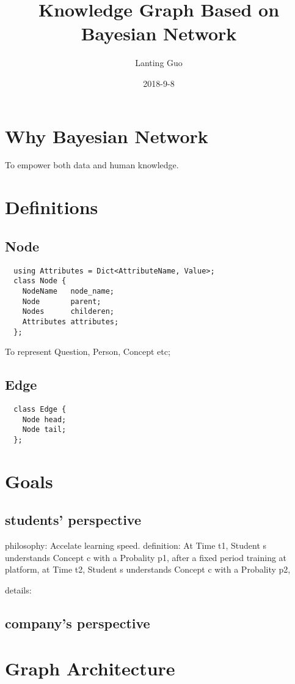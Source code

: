 \documentclass{article}
\title{Knowledge Graph Based on Bayesian Network}
\date{2018-9-8}
\author{Lanting Guo}
\begin{document}
\maketitle
\newpage
\tableofcontents
\newpage
{}

\section{Why Bayesian Network}
To empower both data and human knowledge.
\section{Definitions}
\subsection{Node}
\begin{lstlisting}
  using Attributes = Dict<AttributeName, Value>;
  class Node {
    NodeName   node_name;
    Node       parent;
    Nodes      childeren;
    Attributes attributes;
  };
\end{lstlisting}
To represent Question, Person, Concept etc;
\subsection{Edge}
\begin{lstlisting}
  class Edge {
    Node head;
    Node tail;
  };
\end{lstlisting}

\section{Goals}
\subsection{students' perspective}
philosophy: Accelate learning speed.
definition: At Time t1, Student s understands Concept c with a Probality p1, after a fixed period training at platform,
            at Time t2, Student s understands Concept c with a Probality p2,

details: 
\subsection{company's perspective}
\section{Graph Architecture}
\end{document}
